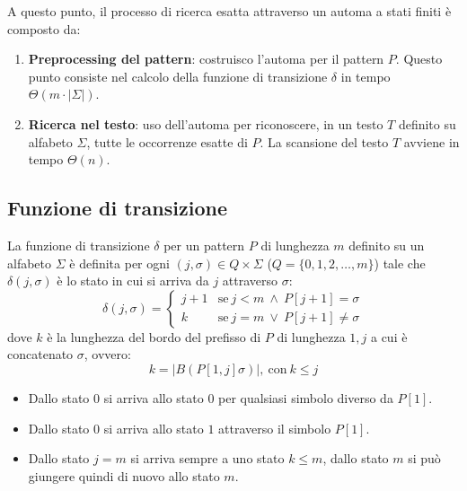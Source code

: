 A questo punto, il processo di ricerca esatta attraverso un automa a stati finiti
è composto da:
\begin{enumerate}
    \item \textbf{Preprocessing del pattern}: costruisco l'automa per il pattern
          $P$. Questo punto consiste nel calcolo della funzione di transizione
          $\delta$ in tempo $\Theta(m \cdot |\Sigma|)$.
    \item \textbf{Ricerca nel testo}: uso dell'automa per riconoscere, in un testo
          $T$ definito su alfabeto $\Sigma$, tutte le occorrenze esatte di $P$.
          La scansione del testo $T$ avviene in tempo $\Theta(n)$.
\end{enumerate}
\subsection{Funzione di transizione}
La funzione di transizione $\delta$ per un pattern $P$ di lunghezza $m$ definito
su un alfabeto $\Sigma$ è definita per ogni $(j, \sigma) \in Q \times \Sigma$ ($Q
    =\{0, 1, 2, \dots, m\}$) tale che $\delta(j, \sigma)$ è lo stato in cui
si arriva da $j$ attraverso $\sigma$:
\begin{equation}
    \delta(j, \sigma) = \begin{cases}
        j + 1 & \text{se} \ j < m \ \land \ P[j + 1] = \sigma   \\
        k     & \text{se} \ j = m \ \lor \ P[j + 1] \neq \sigma
    \end{cases}
\end{equation}
dove $k$ è la lunghezza del bordo del prefisso di $P$ di lunghezza $1, j$ a cui
è concatenato $\sigma$, ovvero:
\begin{equation}
    k = |B(P[1, j]\sigma)|, \ \text{con} \ k \leq j
\end{equation}
\begin{itemize}
    \item Dallo stato $0$ si arriva allo stato $0$ per qualsiasi simbolo diverso
          da $P[1]$.
    \item Dallo stato $0$ si arriva allo stato $1$ attraverso il simbolo $P[1]$.
    \item  Dallo stato $j = m$ si arriva sempre a uno stato $k \leq m$, dallo
          stato $m$ si può giungere quindi di nuovo allo stato $m$.
\end{itemize}
